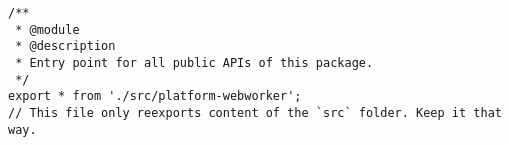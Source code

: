 \begin{verbatim}
/**
 * @module
 * @description
 * Entry point for all public APIs of this package.
 */
export * from './src/platform-webworker';
// This file only reexports content of the `src` folder. Keep it that way.
\end{verbatim}
